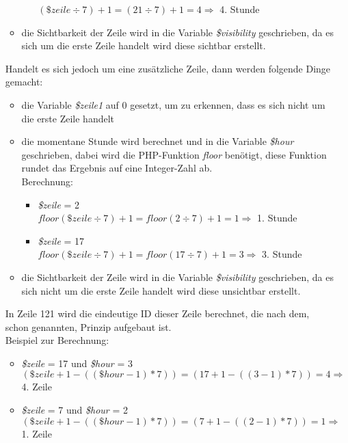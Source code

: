 \begin{enumerate}
\begin{itemize}
\begin{itemize}
			$ (\$zeile \div 7) + 1 = ( 21 \div 7 ) + 1 = 4 \Rightarrow $ 4. Stunde\\
		\end{itemize}
		\item die Sichtbarkeit der Zeile wird in die Variable \textit{\$visibility} geschrieben, da es sich um die erste Zeile handelt wird diese sichtbar erstellt.
	\end{itemize}
	Handelt es sich jedoch um eine zusätzliche Zeile, dann werden folgende Dinge gemacht:
	\begin{itemize}
		\item die Variable \textit{\$zeile1} auf 0 gesetzt, um zu erkennen, dass es sich nicht um die erste Zeile handelt
		\item die momentane Stunde wird berechnet und in die Variable \textit{\$hour} geschrieben, dabei wird die PHP-Funktion \textit{floor} benötigt, diese Funktion rundet das Ergebnis auf eine Integer-Zahl ab.\\
		Berechnung:
		\begin{itemize}
			\item \textit{\$zeile} = 2\\
			$ floor(\$zeile \div 7) + 1 = floor( 2 \div 7 ) + 1 = 1 \Rightarrow $ 1. Stunde
			\item \textit{\$zeile} = 17\\
			$ floor(\$zeile \div 7) + 1 = floor( 17 \div 7 ) + 1 = 3 \Rightarrow $ 3. Stunde\\
		\end{itemize}
		\item die Sichtbarkeit der Zeile wird in die Variable \textit{\$visibility} geschrieben, da es sich nicht um die erste Zeile handelt wird diese unsichtbar erstellt.
	\end{itemize}
	In Zeile 121 wird die eindeutige ID dieser Zeile berechnet, die nach dem, schon genannten, Prinzip aufgebaut ist.\\
	Beispiel zur Berechnung:
	\begin{itemize}
		\item \textit{\$zeile} = 17 und \textit{\$hour} = 3\\
		$ (\$zeile + 1 - ((\$hour - 1 ) \ast 7)) =  (17 + 1 - ((3 - 1) \ast 7)) = 4 \Rightarrow $ 4. Zeile
		\item \textit{\$zeile} = 7 und \textit{\$hour} = 2\\
		$ (\$zeile + 1 - ((\$hour - 1 ) \ast 7)) =  (7 + 1 - ((2 - 1) \ast 7)) = 1 \Rightarrow $ 1. Zeile
	\end{itemize}

\end{enumerate}
